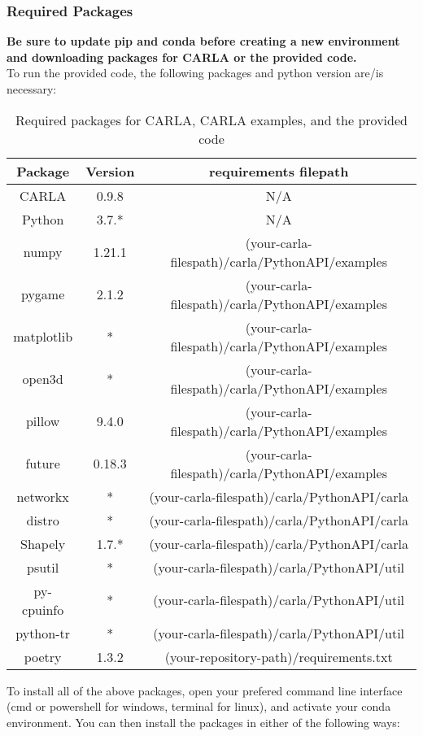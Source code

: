 \documentclass{article}
\begin{document}
\subsubsection{Required Packages}
\label{subsec:Requirements}
\textbf{Be sure to update pip and conda before creating a new environment and downloading packages for CARLA or the provided code.} \\
To run the provided code, the following packages and python version are/is necessary:
\begin{table}[h]
\centering
 \begin{tabular}{| c | c | c |}
 \hline
 Package & Version & requirements filepath \\
 \hline 
CARLA & 0.9.8 & N/A \\
 Python & 3.7.* & N/A \\
 numpy & 1.21.1 & (your-carla-filespath)/carla/PythonAPI/examples \\
 pygame & 2.1.2 & (your-carla-filespath)/carla/PythonAPI/examples \\
 matplotlib & * & (your-carla-filespath)/carla/PythonAPI/examples \\
 open3d & * & (your-carla-filespath)/carla/PythonAPI/examples \\
 pillow & 9.4.0 & (your-carla-filespath)/carla/PythonAPI/examples \\
 future & 0.18.3 & (your-carla-filespath)/carla/PythonAPI/examples \\
 networkx & * & (your-carla-filespath)/carla/PythonAPI/carla \\
 distro & * & (your-carla-filespath)/carla/PythonAPI/carla \\
 Shapely & 1.7.* & (your-carla-filespath)/carla/PythonAPI/carla \\
 psutil & * &  (your-carla-filespath)/carla/PythonAPI/util \\
 py-cpuinfo & * & (your-carla-filespath)/carla/PythonAPI/util \\
 python-tr & * & (your-carla-filespath)/carla/PythonAPI/util \\
 poetry & 1.3.2 & (your-repository-path)/requirements.txt \\
 \hline
 \end{tabular}
\caption{Required packages for CARLA, CARLA examples, and the provided code}
\label{table:RequirementsTable}
\end{table}

\label{table: Required Packages to run the provided code and any CARLA-provided examples}
To install all of the above packages, open your prefered command line interface (cmd or powershell for windows, terminal for linux), and activate your conda environment. You can then install the packages in either of the following ways:
\end{document}
